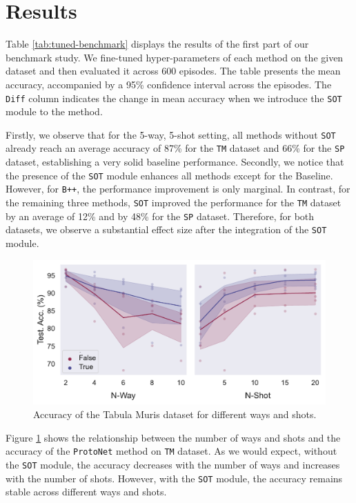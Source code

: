 \section{Results}


Table \ref{tab:tuned-benchmark} displays the results of the first part of 
our benchmark study. We fine-tuned hyper-parameters of each method on the given dataset and 
then evaluated it across 600 episodes. The table presents the mean accuracy,
 accompanied by a 95\% confidence interval across the episodes. 
 The \texttt{Diff} column indicates the change in mean accuracy when we 
 introduce the \texttt{SOT} module to the method.

Firstly, we observe that for the 5-way, 5-shot setting, all methods without 
\texttt{SOT} already reach an average accuracy of 87\% for the \texttt{TM} 
dataset and 66\% for the \texttt{SP} dataset, establishing a very solid baseline performance.
Secondly, we notice that the presence of the \texttt{SOT} module enhances all 
methods except for the Baseline. However, for \texttt{B++}, the performance improvement is only marginal. 
In contrast, for the remaining three methods, \texttt{SOT} improved the performance for the \texttt{TM} dataset 
by an average of 12\% and by 48\% for the \texttt{SP} dataset. 
Therefore, for both datasets, we observe a substantial effect size after the integration of the \texttt{SOT} module.

\begin{figure}
    \centering
    \includegraphics[width=1\columnwidth]{../figures/way-shot.pdf}
    \caption{Accuracy of the Tabula Muris dataset for different ways and shots.}
    \label{fig:way-shot}
\end{figure}


Figure \ref{fig:way-shot} shows the relationship between the number of ways and shots
and the accuracy of the \texttt{ProtoNet} method on \texttt{TM} dataset. 
As we would expect, without the \texttt{SOT} module, the accuracy decreases with the number of ways and 
increases with the number of shots. However, with the \texttt{SOT} module, the accuracy remains 
stable across different ways and shots. 

